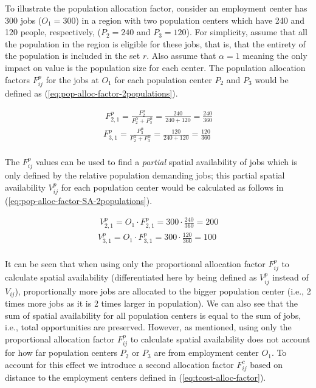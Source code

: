 \documentclass[]{elsarticle} %
\begin{document}
To illustrate the population allocation factor, consider an employment
center has 300 jobs (\(O_1= 300\)) in a region with two population
centers which have 240 and 120 people, respectively, (\(P_2= 240\) and
\(P_3 = 120\)). For simplicity, assume that all the population in the
region is eligible for these jobs, that is, that the entirety of the
population is included in the set \(r\). Also assume that \(\alpha=1\)
meaning the only impact on value is the population size for each center.
The population allocation factors \(F^p_{ij}\) for the jobs at \(O_1\)
for each population center \(P_2\) and \(P_3\) would be defined as
(\ref{eq:pop-alloc-factor-2populations}).

\begin{equation}
\label{eq:pop-alloc-factor-2populations}
\begin{array}{l}\
F^p_{2,1} = \frac{P_2 ^\alpha}{P_2^\alpha + P_3^\alpha} = \frac{240}{240 + 120} = \frac{240}{360}\\
F^p_{3,1} = \frac{P_3^\alpha}{P_2^\alpha + P_3^\alpha}  = \frac{120}{240 + 120} = \frac{120}{360}\\
\end{array}
\end{equation}

The \(F^p_{ij}\) values can be used to find a \emph{partial} spatial
availability of jobs which is only defined by the relative population
demanding jobs; this partial spatial availability \(V^p_{ij}\) for each
population center would be calculated as follows in
(\ref{eq:pop-alloc-factor-SA-2populations}).

\begin{equation}
\label{eq:pop-alloc-factor-SA-2populations}
\begin{array}{l}\
V^p_{2,1} = O_1 \cdot F^p_{2,1} = 300 \cdot \frac{240}{360} = 200 \\
V^p_{3,1} = O_1 \cdot F^p_{3,1} = 300 \cdot \frac{120}{360} = 100 \\
\end{array}
\end{equation}

It can be seen that when using only the proportional allocation factor
\(F^p_{ij}\) to calculate spatial availability (differentiated here by
being defined as \(V^p_{ij}\) instead of \(V_{ij}\)), proportionally
more jobs are allocated to the bigger population center (i.e., 2 times
more jobs as it is 2 times larger in population). We can also see that
the sum of spatial availability for all population centers is equal to
the sum of jobs, i.e., total opportunities are preserved. However, as
mentioned, using only the proportional allocation factor \(F^p_{ij}\) to
calculate spatial availability does not account for how far population
centers \(P_2\) or \(P_3\) are from employment center \(O_1\). To
account for this effect we introduce a second allocation factor
\(F^c_{ij}\) based on distance to the employment centers defined in
(\ref{eq:tcost-alloc-factor}).
\end{document}
